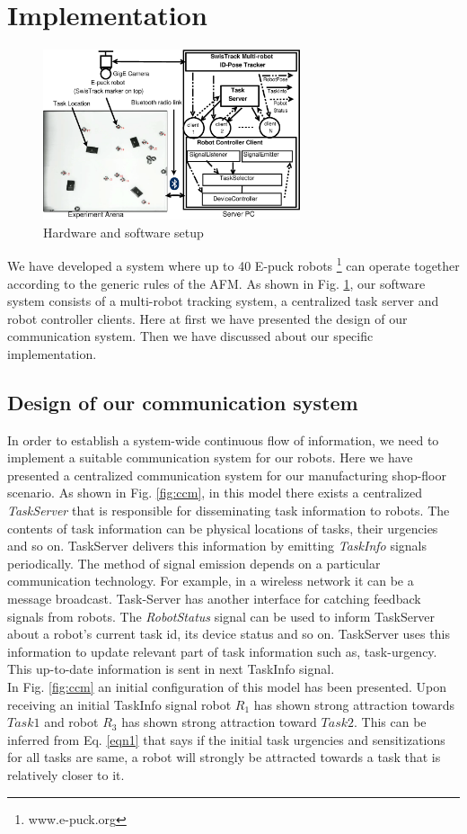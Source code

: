 \documentclass{llncs}
\begin{document}
\section{Implementation}
\label{sec:impl}
\begin{figure}
\centering
\includegraphics[height=5cm, angle=0]
{../dia-files/RIL-Expt-Setup1.eps}
\caption{\small Hardware and software setup}
\label{fig:setup} %
\end{figure}
We have developed a system where up to 40 E-puck robots \footnote{www.e-puck.org} can operate together according to the generic rules of the AFM. As shown in Fig. \ref{fig:setup}, our software system consists of a multi-robot tracking system, a centralized task server and robot controller clients. Here at first we have presented the design of our communication system. Then we have discussed about our specific implementation. 
\subsection{Design of our communication system}
In order to establish a system-wide continuous flow of information, we need to implement a suitable communication system for our robots. Here we have presented a centralized communication system for our manufacturing shop-floor scenario.
As shown in Fig. \ref{fig:ccm}, in this model there exists a centralized \textit{
TaskServer} that is responsible for disseminating task information to robots. The contents of task information can be physical locations of tasks, their urgencies and so on. TaskServer delivers this information by emitting \textit{TaskInfo} signals periodically. The method of signal emission depends on a particular communication technology. For example, in a wireless network it can be a message broadcast.
Task-Server has another interface for catching feedback signals from robots. The \textit{RobotStatus} signal can be used to inform TaskServer about a robot's current task id, its device status and so on. TaskServer uses this information to update relevant part of task information such as, task-urgency. This up-to-date information is sent in next TaskInfo signal.\\
In Fig. \ref{fig:ccm} an initial configuration of this model has been presented. Upon receiving an initial TaskInfo signal robot $R_1$ has shown strong attraction towards $Task1$ and robot $R_3$ has shown strong attraction toward $Task2$. This can be inferred from Eq. \ref{eqn1} that says if the initial task urgencies and sensitizations for all tasks are same, a robot will strongly be attracted towards a task that is relatively closer to it.
\end{document}
